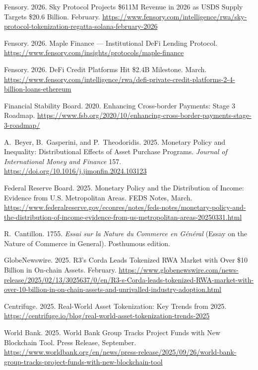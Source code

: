 \documentclass[12pt, a4paper]{report}
\begin{document}
{\begin{enumerate}[label={[\arabic*]}]
\item Fensory. 2026. Sky Protocol Projects \$611M Revenue in 2026 as USDS Supply Targets \$20.6 Billion. February. \url{https://www.fensory.com/intelligence/rwa/sky-protocol-tokenization-regatta-solana-february-2026}

\item Fensory. 2026. Maple Finance --- Institutional DeFi Lending Protocol. \url{https://www.fensory.com/insights/protocols/maple-finance}

\item Fensory. 2026. DeFi Credit Platforms Hit \$2.4B Milestone. March. \url{https://www.fensory.com/intelligence/rwa/defi-private-credit-platforms-2-4-billion-loans-ethereum}

\item Financial Stability Board. 2020. Enhancing Cross-border Payments: Stage 3 Roadmap. \url{https://www.fsb.org/2020/10/enhancing-cross-border-payments-stage-3-roadmap/}

\item A.~Beyer, B.~Gasperini, and P.~Theodoridis. 2025. Monetary Policy and Inequality: Distributional Effects of Asset Purchase Programs. \emph{Journal of International Money and Finance} 157. \url{https://doi.org/10.1016/j.jimonfin.2024.103123}

\item Federal Reserve Board. 2025. Monetary Policy and the Distribution of Income: Evidence from U.S. Metropolitan Areas. FEDS Notes, March. \url{https://www.federalreserve.gov/econres/notes/feds-notes/monetary-policy-and-the-distribution-of-income-evidence-from-us-metropolitan-areas-20250331.html}

\item R.~Cantillon. 1755. \emph{Essai sur la Nature du Commerce en G\'en\'eral} (Essay on the Nature of Commerce in General). Posthumous edition.

\item GlobeNewswire. 2025. R3's Corda Leads Tokenized RWA Market with Over \$10 Billion in On-chain Assets. February. \url{https://www.globenewswire.com/news-release/2025/02/13/3025637/0/en/R3-s-Corda-leads-tokenized-RWA-market-with-over-10-billion-in-on-chain-assets-and-unrivalled-industry-adoption.html}

\item Centrifuge. 2025. Real-World Asset Tokenization: Key Trends from 2025. \url{https://centrifuge.io/blog/real-world-asset-tokenization-trends-2025}

\item World Bank. 2025. World Bank Group Tracks Project Funds with New Blockchain Tool. Press Release, September. \url{https://www.worldbank.org/en/news/press-release/2025/09/26/world-bank-group-tracks-project-funds-with-new-blockchain-tool}


\end{enumerate}}
\end{document}
